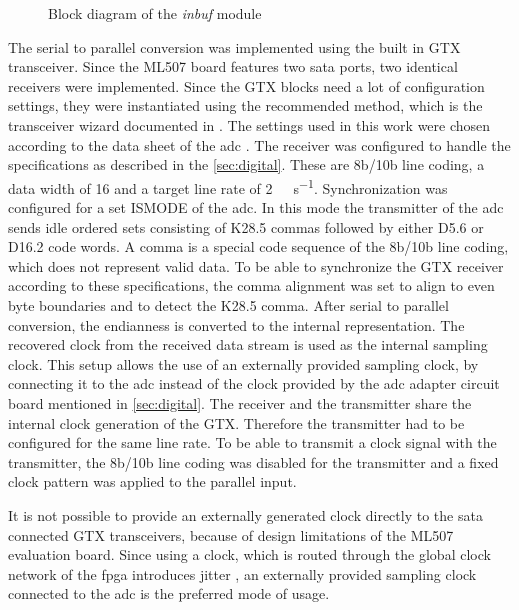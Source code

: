 \documentclass[12pt,a4paper,parskip=full,abstract=true,BCOR=12mm,twoside,open=right]{scrreprt}
\def\device#1{\mbox{\textit{#1}}}
\begin{document}
\begin{figure}[htb]
    \caption{Block diagram of the \device{inbuf} module}
    \label{fig:inbuf}
\end{figure}

The serial to parallel conversion was implemented using the built in GTX
transceiver. Since the ML507 board features two \gls{sata} ports, two
identical receivers were implemented. Since the GTX blocks need
a lot of configuration settings, they were instantiated using the
recommended method, which is the transceiver wizard documented in \cite{gtx_wizard}. The
settings used in this work were chosen according to the data sheet
of the \gls{adc} \cite{ltc2274}. The receiver was configured to handle the
specifications as described in the \cref{sec:digital}. These are 8b/10b line coding,
a data width of \SI{16}{\bit} and a target line rate of \SI{2}{\giga\bit\per\second}.
Synchronization was configured for a set ISMODE of the \gls{adc}. In this mode the
transmitter of the \gls{adc} sends idle ordered sets consisting of
K28.5 commas followed by either D5.6 or D16.2 code words\cite{ltc2274}. A comma is a special
code sequence of the 8b/10b line coding, which does not represent valid data\cite{gtx}.
To be able to synchronize the GTX receiver according to these specifications, the comma
alignment was set to align to even byte boundaries and to detect the K28.5 comma. After
serial to parallel conversion, the endianness is converted to the internal representation.
The recovered clock from the received data stream is used as the internal sampling clock.
This setup allows the use of an externally provided sampling clock, by connecting it to
the \gls{adc} instead of the clock provided by the \gls{adc} adapter circuit board
mentioned in \cref{sec:digital}. The receiver and
the transmitter share the internal clock generation of the GTX. Therefore the transmitter
had to be configured for the same line rate. To be able to transmit a clock signal with the
transmitter, the 8b/10b line coding was disabled for the transmitter and a fixed clock pattern was applied
to the parallel input.

It is not possible to provide an externally generated clock directly to the
\gls{sata} connected GTX transceivers, because of design limitations of the ML507 evaluation
board. Since using a clock, which is routed through the global clock
network of the \gls{fpga} introduces jitter \cite{gtx}, an externally provided sampling clock
connected to the \gls{adc} is the preferred mode of usage.
\end{document}
